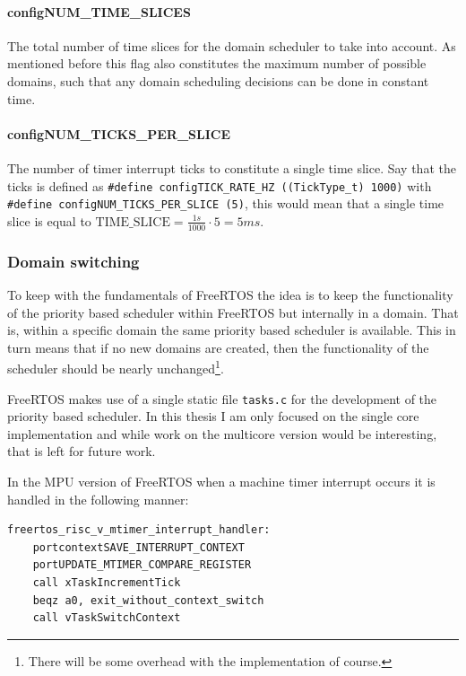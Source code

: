 \paragraph{configNUM\_TIME\_SLICES} The total number of time slices for the
domain scheduler to take into account. As mentioned before this flag also
constitutes the maximum number of possible domains, such that any domain
scheduling decisions can be done in constant time.

\paragraph{configNUM\_TICKS\_PER\_SLICE} The number of timer interrupt ticks to
constitute a single time slice. Say that the ticks is defined as
\texttt{\#define configTICK\_RATE\_HZ ((TickType\_t) 1000)} with \texttt{\#define
configNUM\_TICKS\_PER\_SLICE (5)}, this would mean that a single time slice is
equal to $\text{TIME\_SLICE} = \frac{1s}{1000} \cdot 5 = 5ms$.

\subsubsection{Domain switching}

To keep with the fundamentals of FreeRTOS the idea is to keep the functionality
of the priority based scheduler within FreeRTOS but internally in a domain.
That is, within a specific domain the same priority based scheduler is
available. This in turn means that if no new domains are created, then the
functionality of the scheduler should be nearly unchanged\footnote{There will
be some overhead with the implementation of course.}.

FreeRTOS makes use of a single static file \texttt{tasks.c} for the development
of the priority based scheduler. In this thesis I am only focused on the single
core implementation and while work on the multicore version would be
interesting, that is left for future work.

In the MPU version of FreeRTOS when a machine timer interrupt occurs it is
handled in the following manner:

\begin{lstlisting}[language={[RISC-V]Assembler}, caption={FreeRTOS mtimer interrupt handler}, label={lst:interrupt}]
freertos_risc_v_mtimer_interrupt_handler:
    portcontextSAVE_INTERRUPT_CONTEXT
    portUPDATE_MTIMER_COMPARE_REGISTER
    call xTaskIncrementTick
    beqz a0, exit_without_context_switch 
    call vTaskSwitchContext
\end{lstlisting}

